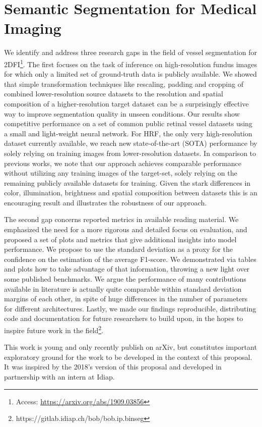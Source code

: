 \documentclass[a4paper,10pt,onecolumn]{article}
\begin{document}
\section{Semantic Segmentation for Medical Imaging}

We identify and address three research gaps in the field of vessel segmentation
for 2DFI\footnote{Access: \url{https://arxiv.org/abs/1909.03856}}.  The first
focuses on the task of inference on high-resolution fundus images for which
only a limited set of ground-truth data is publicly available.  We showed that
simple transformation techniques like rescaling, padding and cropping of
combined lower-resolution source datasets to the resolution and spatial
composition of a higher-resolution target dataset can be a surprisingly
effective way to improve segmentation quality in unseen conditions.  Our
results show competitive performance on a set of common public retinal vessel
datasets using a small and light-weight neural network.  For HRF, the only very
high-resolution dataset currently available, we reach new state-of-the-art
(SOTA) performance by solely relying on training images from lower-resolution
datasets.   In comparison to previous works, we note that our approach achieves
comparable performance without utilizing any training images of the target-set,
solely relying on the remaining publicly available datasets for training. Given
the stark differences in color, illumination, brightness and spatial
composition between datasets this is an encouraging result and illustrates the
robustness of our approach.

The second gap concerns reported metrics in available reading material.  We
emphasized the need for a more rigorous and detailed focus on evaluation, and
proposed a set of plots and metrics that give additional insights into model
performance.  We propose to use the standard deviation as a proxy for the
confidence on the estimation of the average F1-score.  We demonstrated via
tables and plots how to take advantage of that information, throwing a new
light over some published benchmarks.  We argue the performance of many
contributions available in literature is actually quite comparable within
standard deviation margins of each other, in spite of huge differences in the
number of parameters for different architectures.  Lastly, we made our findings
reproducible, distributing code and documentation for future researchers to
build upon, in the hopes to inspire future work in the
field\footnote{https://gitlab.idiap.ch/bob/bob.ip.binseg}.

This work is young and only recently publish on arXiv, but constitutes
important exploratory ground for the work to be developed in the context of
this proposal.  It was inspired by the 2018's version of this proposal and
developed in partnership with an intern at Idiap.
\end{document}
